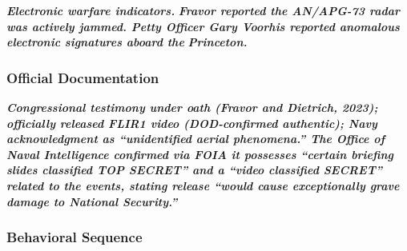 \documentclass[11pt,letterpaper]{article}
\begin{document}
\textbf{\textit{Electronic warfare indicators.}}\textbf{\textit{ Fravor reported the AN/APG-73 radar was actively jammed. Petty Officer Gary Voorhis reported anomalous electronic signatures aboard the }}\textbf{\textit{Princeton}}\textbf{\textit{.}}


\subsubsection{Official Documentation}

\textbf{\textit{Congressional testimony under oath (Fravor and Dietrich, 2023); officially released FLIR1 video (DOD-confirmed authentic); Navy acknowledgment as ``unidentified aerial phenomena.'' The Office of Naval Intelligence confirmed via FOIA it possesses ``certain briefing slides classified TOP SECRET'' and a ``video classified SECRET'' related to the events, stating release ``would cause exceptionally grave damage to National Security.''}}


\subsubsection{Behavioral Sequence}
\end{document}
